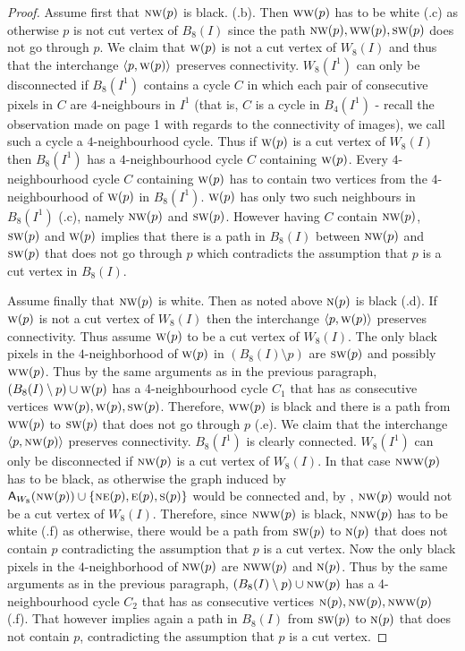 \documentclass[lotsofwhite,charterfonts]{patmorin}
\newcommand{\N}{\textsc{n}}
\newcommand{\NE}{\textsc{ne}}
\newcommand{\E}{\textsc{e}}
\renewcommand{\S}{\textsc{s}}
\newcommand{\SW}{\textsc{sw}}
\newcommand{\W}{\textsc{w}}
\newcommand{\NW}{\textsc{nw}}
\newcommand{\ic}[2]{\langle #1,#2 \rangle}
\newcommand{\A}[2]{\ensuremath{\protect\textup{\textsf{A}}_{#2}(#1)}}
\newcommand{\sm}{\ensuremath{\setminus}}
\begin{document}
\begin{proof}
Assume first that $\NW(p)$ is black. (.b). Then
$\W\W(p)$ has to be white (.c) as otherwise $p$ is not
cut vertex of $B_8(I)$ since the path $\NW(p),\W\W(p) , \SW(p)$ does
not go through $p$. We claim that $\W(p)$ is not a cut vertex of
$W_8(I)$ and thus that the interchange $\ic{p}{\W(p)}$ preserves
connectivity.  $W_8(I^1)$ can only be disconnected if $B_8(I^1)$
contains a cycle $C$ in which each pair of consecutive pixels in $C$
are $4$-neighbours in $I^1$ (that is, $C$ is a cycle in $B_4(I^1)$ -
recall the observation made on page 1 with regards to the connectivity
of images), we call such a cycle a $4$-neighbourhood cycle. Thus if
$\W(p)$ is a cut vertex of $W_8(I)$ then $B_8(I^1)$ has a
$4$-neighbourhood cycle $C$ containing  $\W(p)$. Every
$4$-neighbourhood cycle $C$ containing  $\W(p)$ has to contain two
vertices from the $4$-neighbourhood of $\W(p)$ in $B_8(I^1)$. $\W(p)$
has only two such neighbours in $B_8(I^1)$ (.c), namely
$\NW(p)$ and $\SW(p)$. However having $C$ contain  $\NW(p)$, $\SW(p)$
and $\W(p)$ implies that there is a path in $B_8(I)$ between $\NW(p)$
and $\SW(p)$ that does not go through $p$ which contradicts the
assumption that $p$ is a cut vertex in $B_8(I)$.

Assume finally that $\NW(p)$ is white. Then as noted above $\N(p)$ is
black (.d). If $\W(p)$ is not a cut vertex of $W_8(I)$
then  the interchange $\ic{p}{\W(p)}$ preserves connectivity. Thus
assume $\W(p)$ to be a cut vertex of $W_8(I)$. The only black pixels
in the $4$-neighborhood of $\W(p)$ in $(B_8(I)\sm p)$ are $\SW(p)$ and
possibly $\W\W(p)$. Thus by the same arguments as in the previous
paragraph, $(B_8(I)\sm p)\cup \W(p) $ has a 4-neighbourhood cycle
$C_1$ that has  as consecutive vertices $\W\W(p), \W(p), \SW(p)$.
Therefore, $\W\W(p)$ is black and there is a path from $\W\W(p)$ to
$\SW(p)$ that does not go through $p$ (.e). We claim
that the interchange $\ic{p}{\NW(p)}$ preserves connectivity.
$B_8(I^1)$ is clearly connected. $W_8(I^1)$ can only be disconnected
if $\NW(p)$ is a cut vertex of $W_8(I)$. In that case $\NW\W(p)$ has
to be black, as otherwise the graph induced by $\A{\NW(p)}{W_8}\cup
\{\NE(p), \E(p), \S(p)\}$ would be connected and, by ,
$\NW(p)$ would not be a cut vertex of $W_8(I)$. Therefore, since
$\NW\W(p)$ is black, $\N\NW(p)$ has to be  white (.f)
as otherwise, there would be a path from $\SW(p)$ to $\N(p)$  that
does not contain $p$ contradicting the assumption that $p$ is a cut
vertex.  Now the only black pixels in the $4$-neighborhood of $\NW(p)$
are $\NW\W(p)$ and  $\N(p)$. Thus by the same arguments as in the
previous paragraph, $(B_8(I)\sm p)\cup \NW(p) $ has a 4-neighbourhood
cycle $C_2$ that has as consecutive vertices $\N(p), \NW(p),
\N\W\W(p)$ (.f). That however implies again a path in
$B_8(I)$ from $\SW(p)$ to $\N(p)$ that does not contain $p$,
contradicting the assumption that $p$ is a cut vertex.  
\end{proof}
\end{document}
